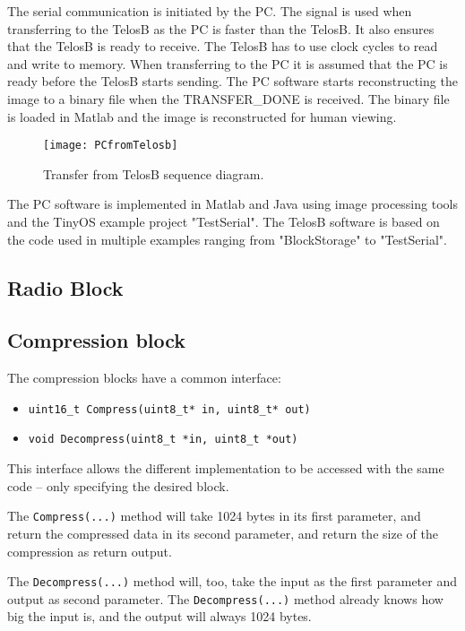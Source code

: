 The serial communication is initiated by the PC. 
The  signal is used when transferring to the TelosB as the PC is faster than the TelosB. 
It also ensures that the TelosB is ready to receive. 
The TelosB has to use clock cycles to read and write to memory. 
When transferring to the PC it is assumed that the PC is ready before the TelosB starts sending. 
The PC software starts reconstructing the image to a binary file when the TRANSFER\_DONE is received. 
The binary file is loaded in Matlab and the image is reconstructed for human viewing.
\begin{figure}[H]
	\centering
	\texttt{[image: PCfromTelosb]}
	\caption{Transfer from TelosB sequence diagram.}
	\label{transferfromtelos}
\end{figure}
The PC software is implemented in Matlab and Java using image processing tools and the TinyOS example project "TestSerial". The TelosB software is based on the code used in multiple examples ranging from "BlockStorage" to "TestSerial". 



\subsection{Radio Block}
\label{sec:Radio-Block}





\subsection{Compression block}
\label{sec:Compression-block}

The compression blocks have a common interface: 

\begin{itemize}
    \item \texttt{uint16\_t Compress(uint8\_t* in, uint8\_t* out)}
    \item \texttt{void Decompress(uint8\_t *in, uint8\_t *out)}
\end{itemize}

This interface allows the different implementation to be accessed with the same code -- only specifying the desired block.

The \texttt{Compress(...)} method will take 1024 bytes in its first parameter, and return the compressed data in its second parameter, and return the size of the compression as return output.

The \texttt{Decompress(...)} method will, too, take the input as the first parameter and output as second parameter. 
The \texttt{Decompress(...)} method already knows how big the input is, and the output will always 1024 bytes.


